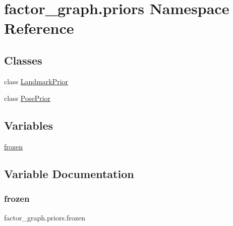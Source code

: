 \hypertarget{namespacefactor__graph_1_1priors}{}\section{factor\+\_\+graph.\+priors Namespace Reference}
\label{namespacefactor__graph_1_1priors}
\subsection*{Classes}
\begin{DoxyCompactItemize}
\item
class \hyperlink{classfactor__graph_1_1priors_1_1LandmarkPrior}{Landmark\+Prior}
\item
class \hyperlink{classfactor__graph_1_1priors_1_1PosePrior}{Pose\+Prior}
\end{DoxyCompactItemize}
\subsection*{Variables}
\begin{DoxyCompactItemize}
\item
\hyperlink{namespacefactor__graph_1_1priors_ade36a93d8d8adb186eb8659a8cb6debd}{frozen}
\end{DoxyCompactItemize}


\subsection{Variable Documentation}
\mbox{\label{namespacefactor__graph_1_1priors_ade36a93d8d8adb186eb8659a8cb6debd}}
\subsubsection{\texorpdfstring{frozen}{frozen}}
{\footnotesize\ttfamily factor\+\_\+graph.\+priors.\+frozen}
